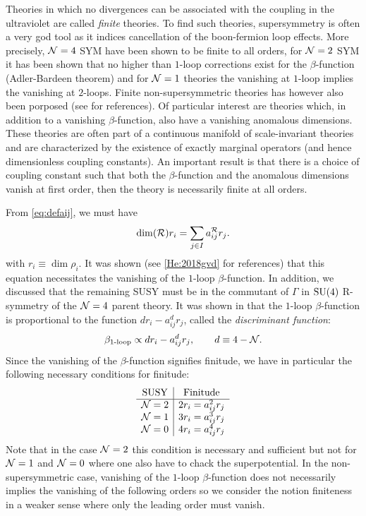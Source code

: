     Theories in which no divergences can be associated with the coupling in the ultraviolet are called \emph{finite} theories. To find such theories, supersymmetry is often a very god tool as it indices cancellation of the boon-fermion loop effects. More precisely, $\mathcal{N}=4$ SYM have been shown to be finite to all orders, for $\mathcal{N}=2$ SYM it has been shown that no higher than $1$-loop corrections exist for the $\beta$-function (Adler-Bardeen theorem) and for $\mathcal{N}=1$ theories the vanishing at $1$-loop implies the vanishing at $2$-loops. Finite non-supersymmetric theories has however also been porposed (see \cite{He:2018gvd} for references). Of particular interest are theories which, in addition to a vanishing $\beta$-function, also have a vanishing anomalous dimensions. These theories are often part of a continuous manifold of scale-invariant theories and are characterized by the existence of exactly marginal operators (and hence dimensionless coupling constants). An important result is that there is a choice of coupling constant such that both the $\beta$-function and the anomalous dimensions vanish at first order, then the theory is necessarily finite at all orders.

    From \eqref{eq:defaij}, we must have
    \begin{equation}
        \dim(\mathcal{R})r_i=\sum_{j\in I}a^{\mathcal{R}}_{ij}r_j.
    \end{equation}
    with $r_i\equiv\dim\rho_i$. It was shown (see \ref{He:2018gvd} for references) that this equation necessitates the vanishing of the $1$-loop $\beta$-function. In addition, we discussed that the remaining SUSY must be in the commutant of $\Gamma$ in $\text{SU}(4)$ R-symmetry of the $\mathcal{N}=4$ parent theory. It was shown in \cite{vafa1998,https://doi.org/10.48550/arxiv.hep-th/9706110} that the $1$-loop $\beta$-function is proportional to the function $dr_i-a^d_{ij}r_j$, called the \emph{discriminant function}:
    \begin{equation*}
        \beta_{1\text{-loop}}\propto dr_i-a^d_{ij}r_j,\qquad d\equiv 4-\mathcal{N}.
    \end{equation*}
    Since the vanishing of the $\beta$-function signifies finitude, we have in particular the following necessary conditions for finitude:
    \begin{equation*}
        \begin{array}{c|c}
            \text{SUSY} & \text{Finitude} \\ \hline
            \mathcal{N}=2 & 2r_i = a^2_{ij}r_j \\
            \mathcal{N}=1 & 3r_i = a^3_{ij}r_j \\
            \mathcal{N}=0 & 4r_i = a^4_{ij}r_j \\
        \end{array}
    \end{equation*}
    Note that in the case $\mathcal{N}=2$ this condition is necessary and sufficient but not for $\mathcal{N}=1$ and $\mathcal{N}=0$ where one also have to chack the superpotential. In the non-supersymmetric case, vanishing of the $1$-loop $\beta$-function does not necessarily implies the vanishing of the following orders so we consider the notion finiteness in a weaker sense where only the leading order must vanish.

